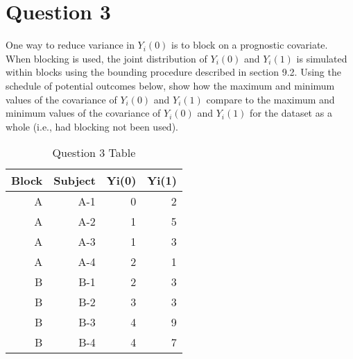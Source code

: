 \documentclass[11pt,notitlepage]{article}\usepackage[]{graphicx}\usepackage[]{color}
\begin{document}
\section*{Question 3}
One way to reduce variance in $Y_i(0)$ is to block on a prognostic covariate. When blocking is used, the joint distribution of $Y_i(0)$ and $Y_i(1)$ is simulated within blocks using the bounding procedure described in section 9.2. Using the schedule of potential outcomes below, show how the maximum and minimum values of the covariance of $Y_i(0)$ and $Y_i(1)$ compare to the maximum and minimum values of the covariance of $Y_i(0)$ and $Y_i(1)$ for the dataset as a whole (i.e., had blocking not been used).

\begin{table}[H]
  \centering
  \caption{Question 3 Table}
    \begin{tabular}{rrrr}
    \toprule
    Block  & Subject  & Yi(0)  & Yi(1)  \\
    \midrule
    A     & A-1   & 0     & 2 \\
    A     & A-2   & 1     & 5 \\
    A     & A-3   & 1     & 3 \\
    A     & A-4   & 2     & 1 \\
    B     & B-1   & 2     & 3 \\
    B     & B-2   & 3     & 3 \\
    B     & B-3   & 4     & 9 \\
    B     & B-4   & 4     & 7 \\
    \bottomrule
    \end{tabular}%
  \label{tab:addlabel}%
\end{table}%
\end{document}
